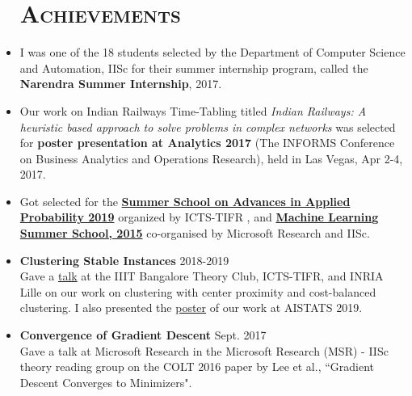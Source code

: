 \documentclass[line,margin]{res}
\begin{document}
\begin{resume}
\begin{itemize}
\section{\textsc{Achievements}}
  \item I was one of the 18 students selected by the Department of Computer Science and Automation, IISc for their summer internship program, called the {\bf Narendra Summer Internship}, 2017.
  \item Our work on Indian Railways Time-Tabling titled \textit{Indian Railways: A heuristic based approach to solve problems in complex networks} was selected for {\bf poster presentation at Analytics 2017} (The INFORMS Conference on Business Analytics and Operations Research), held in Las Vegas, Apr 2-4, 2017.
  \item Got selected for the \href{https://www.icts.res.in/program/paap2019}{\bf Summer School on Advances in Applied Probability 2019} organized by ICTS-TIFR  , and \href{https://www.dropbox.com/s/sthrucrghdsa87t/MLSS_Certificate.pdf?dl=0}{\bf Machine Learning Summer School, 2015} co-organised by Microsoft Research and IISc.
\end{itemize}

\begin{itemize}
\section{\textsc{Presentations}}
\item {\bf Clustering Stable Instances} \hfill 2018-2019  \\
 Gave a \href{https://iiitbtheoryclub.github.io/talks/2018/12/01/clutering-perturbation.html}{talk} at the IIIT Bangalore Theory Club, ICTS-TIFR, and INRIA Lille on our work on clustering with center proximity and cost-balanced clustering. I also presented the \href{https://www.dropbox.com/s/rvypyyg0wyawz33/poster.pdf?dl=0}{poster} of our work at AISTATS 2019.
 \item {\bf Convergence of Gradient Descent} \hfill Sept. 2017\\
  Gave a talk at Microsoft Research in the Microsoft Research (MSR) - IISc theory reading group on the COLT 2016 paper by Lee et al., ``Gradient Descent Converges to Minimizers".
\end{itemize}

\begin{itemize}

\end{itemize}
\end{resume}
\end{document}
